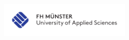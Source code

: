 \thispagestyle{empty}
\vspace*{-2cm} %
\setlength{\unitlength}{1cm}
\hfill
\begin{minipage}[t]{14cm}
\begin{minipage}[t]{7cm}

\end{minipage}
\begin{minipage}[t]{7cm}
   \begin{flushright}
    \includegraphics[width=66mm]{bilder/fhm_Logo_CMYK_30mm.pdf}
   \end{flushright}
\end{minipage}\\
\end{minipage}

